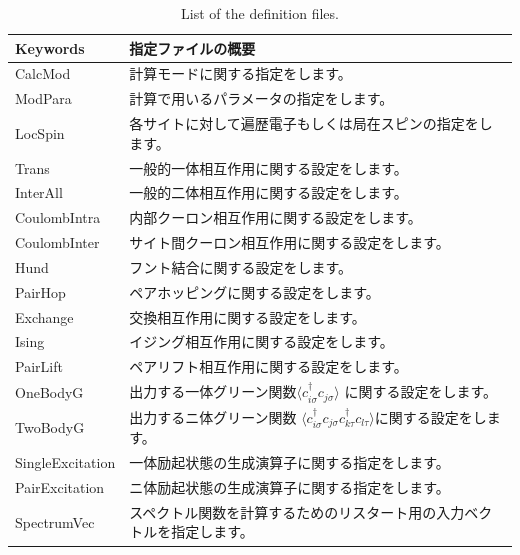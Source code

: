  \begin{table}[h!]
\begin{center}
  \begin{tabular}{ll|} \hline
           Keywords     & 指定ファイルの概要       \\   \hline\hline
           CalcMod      &   計算モードに関する指定をします。  \\  \hline  
           ModPara       &  計算で用いるパラメータの指定をします。  \\ \hline   
           LocSpin         &  各サイトに対して遍歴電子もしくは局在スピンの指定をします。        \\ 
           Trans       &   一般的一体相互作用に関する設定をします。  \\
           InterAll  &   一般的二体相互作用に関する設定をします。 \\  
           CoulombIntra  &   内部クーロン相互作用に関する設定をします。 \\  
           CoulombInter  &   サイト間クーロン相互作用に関する設定をします。\\  
           Hund  &   フント結合に関する設定をします。 \\  
           PairHop  &  ペアホッピングに関する設定をします。 \\  
           Exchange  &  交換相互作用に関する設定をします。 \\  
           Ising  &  イジング相互作用に関する設定をします。 \\  
           PairLift  &   ペアリフト相互作用に関する設定をします。 \\  
           OneBodyG         &   出力する一体グリーン関数$\langle c_{i\sigma}^{\dagger}c_{j\sigma}\rangle$ に関する設定をします。\\   
           TwoBodyG &   出力するニ体グリーン関数 $\langle c_{i\sigma}^{\dagger}c_{j\sigma}c_{k\tau}^{\dagger}c_{l\tau}\rangle$に関する設定をします。 \\   
           {SingleExcitation} &   一体励起状態の生成演算子に関する指定をします。\\ 
           {PairExcitation} &   ニ体励起状態の生成演算子に関する指定をします。\\   
           {SpectrumVec} &   スペクトル関数を計算するためのリスタート用の入力ベクトルを指定します。\\   
           \hline
  \end{tabular}
\end{center}
\caption{List of the definition files.}
\label{Table:Defs}
\end{table}%

